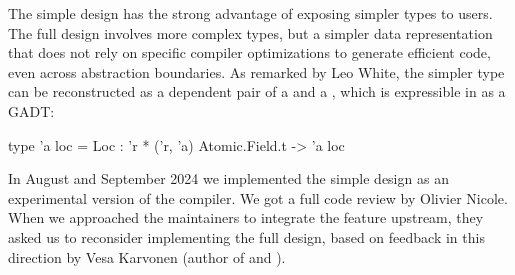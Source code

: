 The simple design has the strong advantage of exposing simpler types to users. The full design involves more complex types, but a simpler data representation that does not rely on specific compiler optimizations to generate efficient code, even across abstraction boundaries. As remarked by Leo White, the simpler type  can be reconstructed as a dependent pair of a  and a , which is expressible in \OCaml as a GADT:
\begin{ocamlcode}
type 'a loc = Loc : 'r * ('r, 'a) Atomic.Field.t -> 'a loc
\end{ocamlcode}

In August and September 2024 we implemented the simple design as an experimental version of the \OCaml compiler. We got a full code review by Olivier Nicole. When we approached the \OCaml maintainers to integrate the feature upstream, they asked us to reconsider implementing the full design, based on feedback in this direction by Vesa Karvonen (author of \Kcas and \Saturn).


